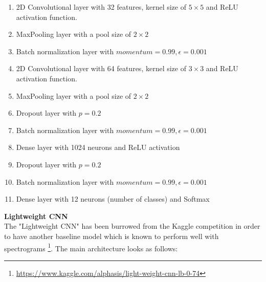 \documentclass{article}
\theoremstyle{definition}
\theoremstyle{remark}
\begin{document}
\begin{enumerate}
	\item 2D Convolutional layer with 32 features, kernel size of $5 \times 5$ and ReLU activation function.
	\item MaxPooling layer with a pool size of $2 \times 2$
	\item Batch normalization layer with $momentum=0.99, \epsilon=0.001$
	\item 2D Convolutional layer with 64 features, kernel size of $3 \times 3$ and ReLU activation function.
	\item MaxPooling layer with a pool size of $2 \times 2$
	\item Dropout layer with $p = 0.2$
	\item Batch normalization layer with $momentum=0.99, \epsilon=0.001$
	\item Dense layer with 1024 neurons and ReLU activation
	\item Dropout layer with $p = 0.2$
	\item Batch normalization layer with $momentum=0.99, \epsilon=0.001$
	\item Dense layer with 12 neurons (number of classes) and Softmax
\end{enumerate}



\noindent\textbf{Lightweight CNN}\\

The "Lightweight CNN" has been burrowed from the Kaggle competition in order to have another baseline model which is known to perform well with spectrograms \footnote{\url{https://www.kaggle.com/alphasis/light-weight-cnn-lb-0-74}}. The main architecture looks as follows:
\end{document}
